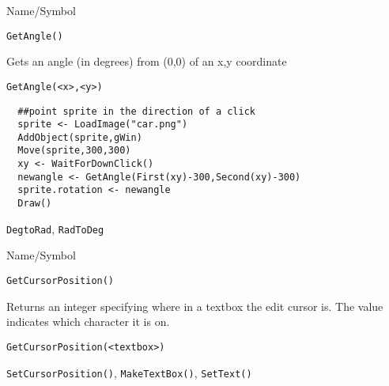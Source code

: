 \begin{desc}{Name/Symbol}
\item[Name/Symbol]	\verb+GetAngle()+

\item[Description]	Gets  an angle (in degrees) from (0,0) of an x,y coordinate


\item[Usage]
\begin{verbatim}
GetAngle(<x>,<y>)
\end{verbatim}

\item[Example]	
\begin{verbatim}
  ##point sprite in the direction of a click   
  sprite <- LoadImage("car.png")
  AddObject(sprite,gWin)
  Move(sprite,300,300)
  xy <- WaitForDownClick()
  newangle <- GetAngle(First(xy)-300,Second(xy)-300)
  sprite.rotation <- newangle
  Draw()
\end{verbatim}

\item[See Also]	\verb+DegtoRad+, \verb+RadToDeg+
\end{desc}

\rl



\begin{desc}{Name/Symbol}
\item[Name/Symbol]	\verb+GetCursorPosition()+

\item[Description]	Returns an integer specifying where in a textbox the edit cursor is.  The value indicates which character it is on.

\item[Usage]
\begin{verbatim}
GetCursorPosition(<textbox>)
\end{verbatim}

\item[Example]	

\item[See Also]	\verb+SetCursorPosition()+, \verb+MakeTextBox()+, \verb+SetText()+
\end{desc}

\rl



